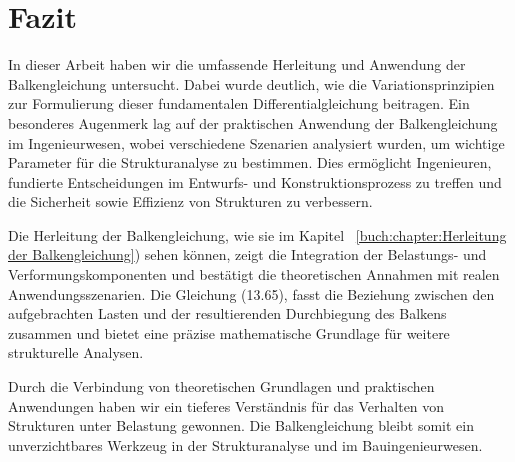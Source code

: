 %
%
%
%
\section{Fazit\label{balken:section:teil4}}

In dieser Arbeit haben wir die umfassende Herleitung und Anwendung der Balkengleichung untersucht. Dabei wurde deutlich, wie die Variationsprinzipien zur Formulierung dieser fundamentalen Differentialgleichung beitragen. Ein besonderes Augenmerk lag auf der praktischen Anwendung der Balkengleichung im Ingenieurwesen, wobei verschiedene Szenarien analysiert wurden, um wichtige Parameter für die Strukturanalyse zu bestimmen. Dies ermöglicht Ingenieuren, fundierte Entscheidungen im Entwurfs- und Konstruktionsprozess zu treffen und die Sicherheit sowie Effizienz von Strukturen zu verbessern.

Die Herleitung der Balkengleichung, wie sie im Kapitel ~\ref{buch:chapter:Herleitung der Balkengleichung}) sehen können, zeigt die Integration der Belastungs- und Verformungskomponenten und bestätigt die theoretischen Annahmen mit realen Anwendungsszenarien. Die Gleichung (13.65), fasst die Beziehung zwischen den aufgebrachten Lasten und der resultierenden Durchbiegung des Balkens zusammen und bietet eine präzise mathematische Grundlage für weitere strukturelle Analysen.

Durch die Verbindung von theoretischen Grundlagen und praktischen Anwendungen haben wir ein tieferes Verständnis für das Verhalten von Strukturen unter Belastung gewonnen. Die Balkengleichung bleibt somit ein unverzichtbares Werkzeug in der Strukturanalyse und im Bauingenieurwesen.


